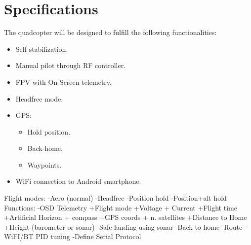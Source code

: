 \section{Specifications}
The quadcopter will be designed to fulfill the following functionalities:
\begin{itemize}
\item Self stabilization.
\item Manual pilot through RF controller.
\item FPV with On-Screen telemetry.
\item Headfree mode.
\item GPS:
\begin{itemize}
\item Hold position.
\item Back-home.
\item Waypoints.
\end{itemize}
\item WiFi connection to Android smartphone.
\end{itemize}

Flight modes:
 -Acro (normal)
 -Headfree
 -Position hold
 -Position+alt hold
Functions:
 -OSD Telemetry
   +Flight mode
   +Voltage + Current
   +Flight time
   +Artificial Horizon + compass
   +GPS coords + n. satellites
   +Distance to Home
   +Height (barometer or sonar)
 -Safe landing using sonar
 -Back-to-home
 -Route
 -WiFI/BT PID tuning
-Define Serial Protocol

